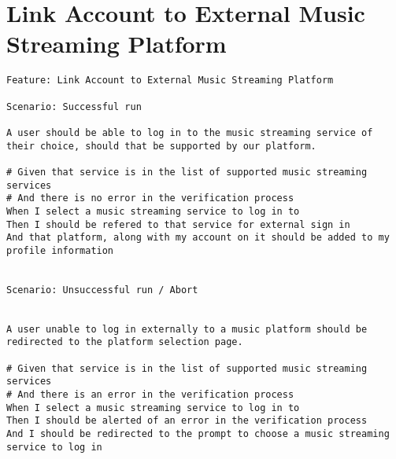 \documentclass[11pt]{article}
\begin{document}
\section{Link Account to External Music Streaming Platform}
\label{sec:orgc768cb0}
\begin{verbatim}
Feature: Link Account to External Music Streaming Platform 

Scenario: Successful run

A user should be able to log in to the music streaming service of their choice, should that be supported by our platform.

# Given that service is in the list of supported music streaming services
# And there is no error in the verification process
When I select a music streaming service to log in to
Then I should be refered to that service for external sign in
And that platform, along with my account on it should be added to my profile information


Scenario: Unsuccessful run / Abort


A user unable to log in externally to a music platform should be redirected to the platform selection page.

# Given that service is in the list of supported music streaming services
# And there is an error in the verification process
When I select a music streaming service to log in to
Then I should be alerted of an error in the verification process
And I should be redirected to the prompt to choose a music streaming service to log in

\end{verbatim}
\end{document}

